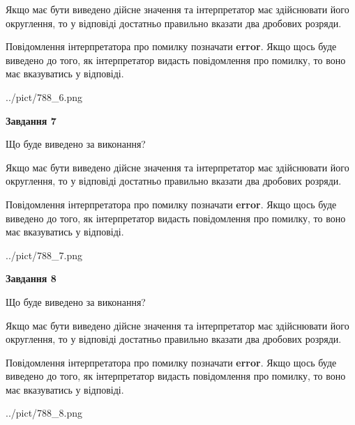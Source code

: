 \documentclass[12pt, ukrainian]{article}
\begin{document}
{\begin {Large}
Якщо має бути виведено дійсне значення та інтерпретатор має здійснювати його округлення, 
то у відповіді достатньо правильно вказати два дробових розряди.

Повідомлення інтерпретатора про помилку позначати \textbf{error}.
Якщо щось буде виведено до того, як інтерпретатор видасть повідомлення про помилку, 
то воно має вказуватись у відповіді. \par

\begin{center}
	{../pict/788_6.png}
\end{center}
\newpage

{\begin {center}\textbf{Завдання 7}\end {center}}\par
Що буде виведено за виконання? \par

Якщо має бути виведено дійсне значення та інтерпретатор має здійснювати його округлення, 
то у відповіді достатньо правильно вказати два дробових розряди.

Повідомлення інтерпретатора про помилку позначати \textbf{error}.
Якщо щось буде виведено до того, як інтерпретатор видасть повідомлення про помилку, 
то воно має вказуватись у відповіді. \par

\begin{center}
	{../pict/788_7.png}
\end{center}
\newpage

{\begin {center}\textbf{Завдання 8}\end {center}}\par
Що буде виведено за виконання? \par

Якщо має бути виведено дійсне значення та інтерпретатор має здійснювати його округлення, 
то у відповіді достатньо правильно вказати два дробових розряди.

Повідомлення інтерпретатора про помилку позначати \textbf{error}.
Якщо щось буде виведено до того, як інтерпретатор видасть повідомлення про помилку, 
то воно має вказуватись у відповіді. \par

\begin{center}
	{../pict/788_8.png}
\end{center}
\newpage


\end{Large}}
\end{document}
